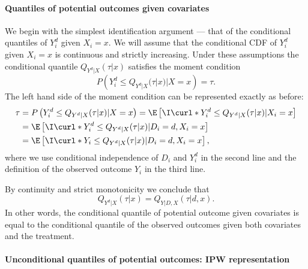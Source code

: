  \paragraph{Quantiles of potential outcomes given covariates}
  
  We begin with the simplest identification argument --- that of the conditional quantiles of $Y^d_i$ given $X_i=x$.   We will assume that the conditional CDF of $Y^d_i$ given $X_i=x$ is continuous and strictly increasing. Under these assumptions the conditional quantile $Q_{Y^d|X}(\tau|x)$ satisfies the moment condition
  \begin{equation}
P\left(Y^d_i \leq Q_{Y^d|X}(\tau|x)|X=x \right) =  \tau.
   \end{equation}
The left hand side of the moment condition can be represented exactly as before:
 \begin{align}
 	\tau & = P\left(Y^d_i \leq Q_{Y^d|X}(\tau|x)|X=x \right) = \E\left[ \I\curl*{ Y^d_i \leq Q_{Y^d|X}(\tau|x) } |X_i=x\right]\\
 	& =  \E\left[ \I\curl*{ Y^d_i \leq Q_{Y^d|X}(\tau|x) } |D_i=d, X_i=x\right]\\
 	& = \E\left[ \I\curl*{ Y_i \leq Q_{Y^d|X}(\tau|x) } |D_i=d, X_i=x\right],
 \end{align} 
 where we use conditional independence of $D_i$ and $Y_i^d$ in the second line and the definition of the observed outcome $Y_i$ in the third line.
 
 By continuity and strict monotonicity we conclude that 
 \begin{equation}\label{quantile:equation:conditional_potential_outcomes_quantile_idenfication}
 	 Q_{Y^d|X}(\tau|x) = Q_{Y|D, X}(\tau|d, x).
 \end{equation}
 In other words, the conditional quantile of potential outcome given covariates is equal to the conditional quantile of the observed outcomes given both covariates and the treatment. 
 
 
 
 
 \paragraph{Unconditional quantiles of potential outcomes: IPW representation}
 
